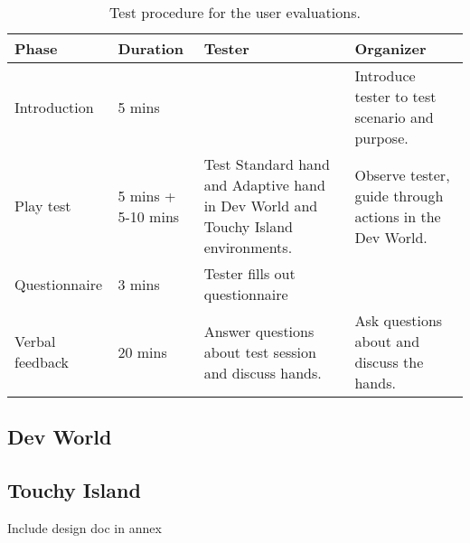 \begin{table}[h]
\centering
\caption{Test procedure for the user evaluations.}
\label{tab:testProcedure}
\begin{tabular}{lL{2cm}L{5cm}L{5cm}}
Phase & Duration & Tester & Organizer \\ \midrule \midrule
Introduction & 5 mins & & Introduce tester to test scenario and purpose. \\ \midrule
Play test & 5 mins + 5-10 mins & Test Standard hand and Adaptive hand in Dev World and Touchy Island environments. & Observe tester, guide through actions in the Dev World. \\ \midrule
Questionnaire & 3 mins &Tester fills out questionnaire & \\ \midrule
Verbal feedback & 20 mins & Answer questions about test session and discuss hands. & Ask questions about and discuss the hands. \\
\end{tabular}
\end{table}

\subsection{Dev World}
\label{subsec:devWorld}

\subsection{Touchy Island}
\label{subsec:touchyIsland}

Include design doc in annex